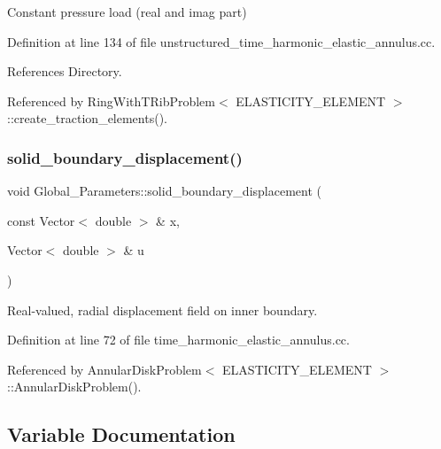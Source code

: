 Constant pressure load (real and imag part) 



Definition at line 134 of file unstructured\+\_\+time\+\_\+harmonic\+\_\+elastic\+\_\+annulus.\+cc.



References Directory.



Referenced by Ring\+With\+T\+Rib\+Problem$<$ E\+L\+A\+S\+T\+I\+C\+I\+T\+Y\+\_\+\+E\+L\+E\+M\+E\+N\+T $>$\+::create\+\_\+traction\+\_\+elements().

\mbox{\label{namespaceGlobal__Parameters_a95af753fa152ac6013bc4f640816f7ce}} 
\subsubsection{\texorpdfstring{solid\+\_\+boundary\+\_\+displacement()}{solid\_boundary\_displacement()}}
{\footnotesize\ttfamily void Global\+\_\+\+Parameters\+::solid\+\_\+boundary\+\_\+displacement (\begin{DoxyParamCaption}\item[{const Vector$<$ double $>$ \&}]{x,  }\item[{Vector$<$ double $>$ \&}]{u }\end{DoxyParamCaption})}



Real-\/valued, radial displacement field on inner boundary. 



Definition at line 72 of file time\+\_\+harmonic\+\_\+elastic\+\_\+annulus.\+cc.



Referenced by Annular\+Disk\+Problem$<$ E\+L\+A\+S\+T\+I\+C\+I\+T\+Y\+\_\+\+E\+L\+E\+M\+E\+N\+T $>$\+::\+Annular\+Disk\+Problem().



\subsection{Variable Documentation}
\mbox{\label{namespaceGlobal__Parameters_afbe27ad463a1fb23cb99d029a9fac731}} 
